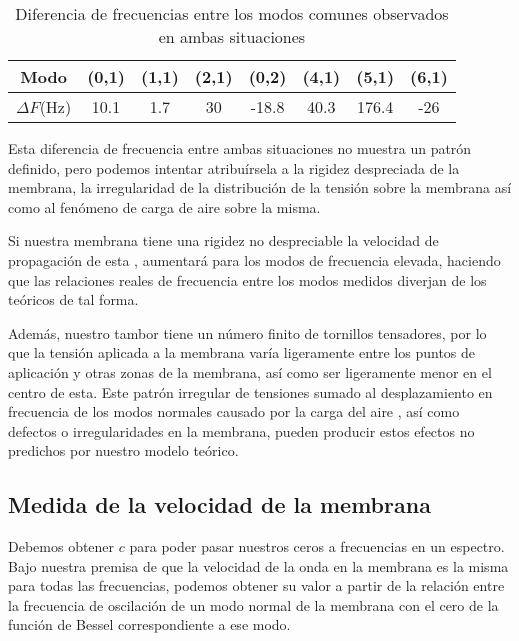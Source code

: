 \documentclass[journal, a4paper,onecolumn]{IEEEtran}
\begin{document}
 \begin{table}[H]
 \centering
\begin{tabular}{c|c|c|c|c|c|c|c}
Modo       & (0,1) & (1,1) & (2,1) & (0,2) & (4,1) & (5,1) & (6,1) \\ \hline
$\Delta F$(Hz) & 10.1  & 1.7   & 30    & -18.8 & 40.3  & 176.4 & -26  
\end{tabular}
\caption{Diferencia de frecuencias entre los modos comunes observados en ambas situaciones}
\label{diffrequmodos}
\end{table}

Esta diferencia de frecuencia entre ambas situaciones no muestra un patrón definido, pero podemos intentar atribuírsela a la rigidez despreciada de la membrana, la irregularidad de la distribución de la tensión sobre la membrana así como al fenómeno de carga de aire sobre la misma. \newline

Si nuestra membrana tiene una rigidez no despreciable la velocidad de propagación de esta , aumentará para los modos de frecuencia elevada, haciendo que las relaciones reales de frecuencia entre los modos medidos diverjan de los teóricos de tal forma.\newline 

Además, nuestro tambor tiene un número finito de tornillos tensadores, por lo que la tensión aplicada a la membrana varía ligeramente entre los puntos de aplicación y otras zonas de la membrana, así como ser ligeramente menor en el centro de esta. Este patrón irregular de tensiones sumado al desplazamiento en frecuencia de los modos normales causado por la carga del aire \cite{fisicamusical} , así como defectos o irregularidades en la membrana, pueden producir estos efectos no predichos por nuestro modelo teórico.


\subsection{Medida de la velocidad de la membrana}

Debemos obtener $c$ para poder pasar nuestros ceros a frecuencias en un espectro. Bajo nuestra premisa de que la velocidad de la onda en la membrana es la misma para todas las frecuencias, podemos obtener su valor a partir de la relación entre la frecuencia de oscilación de un modo normal de la membrana con el cero de la función de Bessel correspondiente a ese modo. \newline
\end{document}
